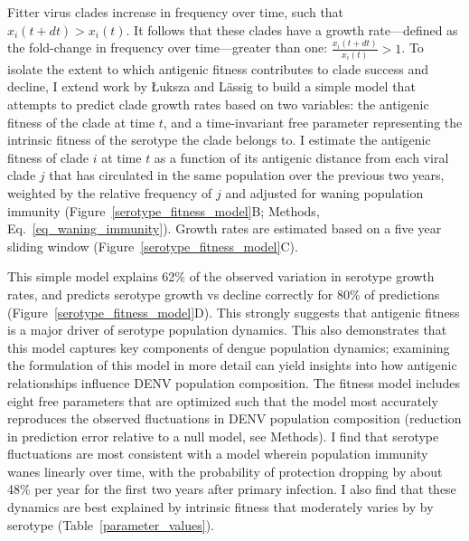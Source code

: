 Fitter virus clades increase in frequency over time, such that $x_i(t+dt) > x_i(t)$.
It follows that these clades have a growth rate---defined as the fold-change in frequency over time---greater than one: $\frac{x_i(t+dt)}{x_i(t)} > 1$.
To isolate the extent to which antigenic fitness contributes to clade success and decline, I extend work by {\L}uksza and L\"assig  \citep{luksza2014predictive} to build a simple model that attempts to predict clade growth rates based on two variables: the antigenic fitness of the clade at time $t$, and a time-invariant free parameter representing the intrinsic fitness of the serotype the clade belongs to.
I estimate the antigenic fitness of clade $i$ at time $t$ as a function of its antigenic distance from each viral clade $j$ that has circulated in the same population over the previous two years, weighted by the relative frequency of $j$ and adjusted for waning population immunity (Figure~\ref{serotype_fitness_model}B; Methods, Eq.~\ref{eq_waning_immunity}).
Growth rates are estimated based on a five year sliding window (Figure~\ref{serotype_fitness_model}C).

This simple model explains 62\% of the observed variation in serotype growth rates, and predicts serotype growth vs decline correctly for 80\% of predictions (Figure~\ref{serotype_fitness_model}D).
This strongly suggests that antigenic fitness is a major driver of serotype population dynamics.
This also demonstrates that this model captures key components of dengue population dynamics; examining the formulation of this model in more detail can yield insights into how antigenic relationships influence DENV population composition.
The fitness model includes eight free parameters that are optimized such that the model most accurately reproduces the observed fluctuations in DENV population composition (reduction in prediction error relative to a null model, see Methods).
I find that serotype fluctuations are most consistent with a model wherein population immunity wanes linearly over time, with the probability of protection dropping by about 48\% per year for the first two years after primary infection.
I also find that these dynamics are best explained by intrinsic fitness that moderately varies by by serotype (Table~\ref{parameter_values}).

